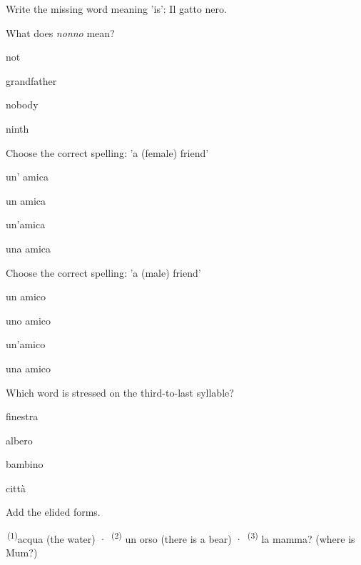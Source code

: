 \documentclass[11pt,a4paper,twoside,openright]{book}
\newcommand{\blank}{\underline{\hspace{2.6cm}}}
\newcommand{\clozeblank}[1]{\underline{\hspace{2.4cm}}\textsuperscript{\,(#1)}}
\begin{document}
\begin{exercises}
\item\label{ex:stress-doubles-accents-1}\relax Write the missing word meaning 'is': Il gatto \blank{} nero.
\item\label{ex:stress-doubles-accents-2}\relax What does \textit{nonno} mean?\par\nopagebreak\begin{options}
\item\relax not
\item\relax grandfather
\item\relax nobody
\item\relax ninth
\end{options}
\item\label{ex:stress-doubles-accents-3}\relax Choose the correct spelling: 'a (female) friend'\par\nopagebreak\begin{options}
\item\relax un' amica
\item\relax un amica
\item\relax un'amica
\item\relax una amica
\end{options}
\item\label{ex:stress-doubles-accents-4}\relax Choose the correct spelling: 'a (male) friend'\par\nopagebreak\begin{options}
\item\relax un amico
\item\relax uno amico
\item\relax un'amico
\item\relax una amico
\end{options}
\item\label{ex:stress-doubles-accents-5}\relax Which word is stressed on the third-to-last syllable?\par\nopagebreak\begin{options}
\item\relax finestra
\item\relax albero
\item\relax bambino
\item\relax città
\end{options}
\item\label{ex:stress-doubles-accents-6}\relax Add the elided forms.\par\smallskip\begingroup\setlength{\parindent}{0pt}\clozeblank{1}acqua (the water) · \clozeblank{2} un orso (there is a bear) · \clozeblank{3} la mamma? (where is Mum?)\par\endgroup
\end{exercises}
\end{document}
